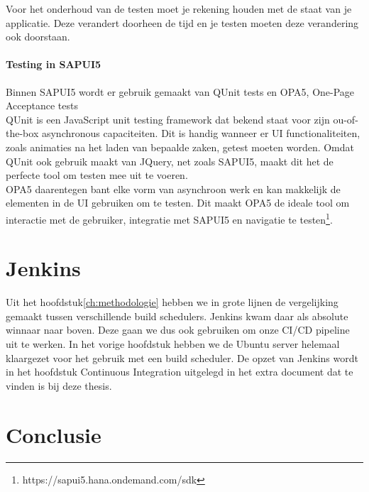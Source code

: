 Voor het onderhoud van de testen moet je rekening houden met de staat van je applicatie. Deze verandert doorheen de tijd en je testen moeten deze verandering ook doorstaan.

    \paragraph{Testing in SAPUI5}
    Binnen SAPUI5 wordt er gebruik gemaakt van QUnit tests en OPA5, One-Page Acceptance tests\\
    QUnit is een JavaScript unit testing framework dat bekend staat voor zijn ou-of-the-box asynchronous capaciteiten. Dit is handig wanneer er UI functionaliteiten, zoals animaties na het laden van bepaalde zaken, getest moeten worden. Omdat QUnit ook gebruik maakt van JQuery, net zoals SAPUI5, maakt dit het de perfecte tool om testen mee uit te voeren.\\
    OPA5 daarentegen bant elke vorm van asynchroon werk en kan makkelijk de elementen in de UI gebruiken om te testen. Dit maakt OPA5 de ideale tool om interactie met de gebruiker, integratie met SAPUI5 en navigatie te testen\footnote{https://sapui5.hana.ondemand.com/sdk}.
    
\section{Jenkins}
\label{sec:short-list}
Uit het hoofdstuk\ref{ch:methodologie} hebben we in grote lijnen de vergelijking gemaakt tussen verschillende build schedulers. Jenkins kwam daar als absolute winnaar naar boven. Deze gaan we dus ook gebruiken om onze CI/CD pipeline uit te werken.
In het vorige hoofdstuk hebben we de Ubuntu server helemaal klaargezet voor het gebruik met een build scheduler. De opzet van Jenkins wordt in het hoofdstuk Continuous Integration uitgelegd in het extra document dat te vinden is bij deze thesis.
    
\section{Conclusie}
\label{sec:conclusie}
